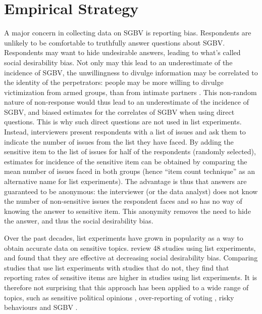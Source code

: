\section{Empirical Strategy}
A major concern in collecting data on SGBV is reporting bias. Respondents are unlikely to be comfortable to truthfully answer questions about SGBV. Respondents may want to hide undesirable answers, leading to what's called social desirability bias. Not only may this lead to an underestimate of the incidence of SGBV, the unwillingness to divulge information may be correlated to the identity of the perpetrators: people may be more willing to divulge victimization from armed groups, than from intimate partners \citep{Stark2017}. This non-random nature of non-response would thus lead to an underestimate of the incidence of SGBV, and biased estimates for the correlates of SGBV when using direct questions. This is why such direct questions are not used in list experiments. Instead, interviewers present respondents with a list of issues and ask them to indicate the number of issues from the list they have faced. By adding the sensitive item to the list of issues for half of the respondents (randomly selected), estimates for incidence of the sensitive item can be obtained by comparing the mean number of issues faced in both groups (hence ``item count technique'' as an alternative name for list experiments). The advantage is thus that answers are guaranteed to be anonymous: the interviewer (or the data analyst) does not know the number of non-sensitive issues the respondent faces and so has no way of knowing the answer to sensitive item. This anonymity removes the need to hide the answer, and thus the social desirability bias. 

Over the past decades, list experiments have grown in popularity as a way to obtain accurate data on sensitive topics. \cite{Holbrook2010} review 48 studies using list experiments, and found that they are effective at decreasing social desirability bias. Comparing studies that use list experiments with studies that do not, they find that reporting rates of sensitive items are higher in studies using list experiments. It is therefore not surprising that this approach has been applied to a wide range of topics, such as sensitive political opinions \citep{Frye2017,Blair2014,Meng2017,Corstange2009}, over-reporting of voting \citep{Holbrook2010}, risky behaviours \citep{LaBrie2000} and SGBV \citep{Bulte2019,Peterman2018}.

